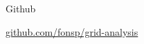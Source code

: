 \documentclass[10pt]{beamer}
\begin{document}
{
\begin{frame}[plain]
\end{frame}
}

\begin{frame}{Github}
  \begin{center}\href{https://github.com/fonsp/grid-analysis}{github.com/fonsp/grid-analysis}\end{center}
\end{frame}
\end{document}
